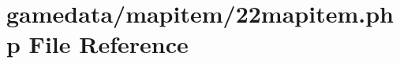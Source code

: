 \hypertarget{22mapitem_8php}{\section{gamedata/mapitem/22mapitem.php File Reference}
\label{22mapitem_8php}
}
